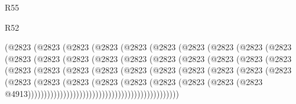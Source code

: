 \begin{lexlean}{R55}
\begin{lexlean}{R52}
\begin{coremodule}
{{{{{{{{{{{{{{{{{{{{{{{{{{{{{{{{{{{{{{{{{{{{{{{{{{{{{{{{{{{{{{{{{{{{{{{{{{{{{{{{{{{{{{{{{{{{{{{{{{{{{{{{{{{{{{{{{{{{{{{{{{{{{{{{{{{{{{{{{{{{{{{{{{{{{{{{{{{{{{{{{{{{{{{{{{{{{{{{{{{{{{{{{{{{{{{{{{{{{{                    (@2823
                      (@2823
                        (@2823
                          (@2823
                            (@2823
                              (@2823
                                (@2823
                                  (@2823
                                    (@2823
                                      (@2823
                                        (@2823
                                          (@2823
                                            (@2823
                                              (@2823
                                                (@2823
                                                  (@2823
                                                    (@2823
                                                      (@2823
                                                        (@2823
                                                          (@2823
                                                            (@2823
                                                              (@2823
                                                                (@2823
                                                                  (@2823
                                                                    (@2823
                                                                      (@2823
                                                                        (@2823
                                                                          (@2823
                                                                            (@2823
                                                                              (@2823
                                                                                (@2823
                                                                                  (@2823
                                                                                    (@2823
                                                                                      (@2823
                                                                                        (@2823
                                                                                          (@2823
                                                                                            (@2823
                                                                                              (@2823
                                                                                                (@2823
                                                                                                  @4913)))))))))))))))))))))))))))))))))))))))))))))))
}}}}}}}}}}}}}}}}}}}}}}}}}}}}}}}}}}}}}}}}}}}}}}}}}}}}}}}}}}}}}}}}}}}}}}}}}}}}}}}}}}}}}}}}}}}}}}}}}}}}}}}}}}}}}}}}}}}}}}}}}}}}}}}}}}}}}}}}}}}}}}}}}}}}}}}}}}}}}}}}}}}}}}}}}}}}}}}}}}}}}}}}}}}}}}}}}}}}}}
\end{coremodule}
\end{lexlean}
\end{lexlean}
